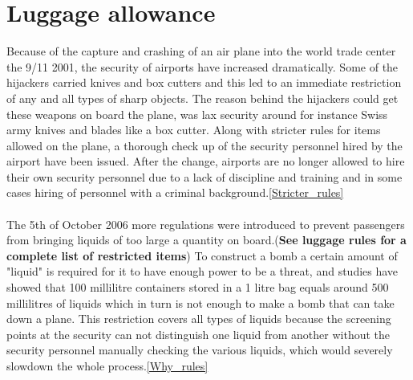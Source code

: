 \section{Luggage allowance}

Because of the capture and crashing of an air plane into the world trade center the 9/11 2001, the security of airports have increased dramatically. Some of the hijackers carried knives and box cutters and this led to an immediate restriction of any and all types of sharp objects. The reason behind the hijackers could get these weapons on board the plane, was lax security around for instance Swiss army knives and blades like a box cutter. Along with stricter rules for items allowed on the plane, a thorough check up of the security personnel hired by the airport have been issued. After the change, airports are no longer allowed to hire their own security personnel due to a lack of discipline and training and in some cases hiring of personnel with a criminal background.\ref{Stricter_rules}\\
\\
The 5th of October 2006 more regulations were introduced to prevent passengers from bringing liquids of too large a quantity on board.(\textbf{See luggage rules for a complete list of restricted items}) To construct a bomb a certain amount of "liquid" is required for it to have enough power to be a threat, and studies have showed that 100 millilitre containers stored in a 1 litre bag equals around 500 millilitres of liquids which in turn is not enough to make a bomb that can take down a plane. This restriction covers all types of liquids because the screening points at the security can not distinguish one liquid from another without the security personnel manually checking the various liquids, which would severely slowdown the whole process.\ref{Why_rules}
